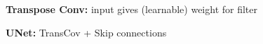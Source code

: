 \textbf{Transpose Conv:} input gives (learnable) weight for filter\\

\textbf{UNet:} TransCov + Skip connections\\

